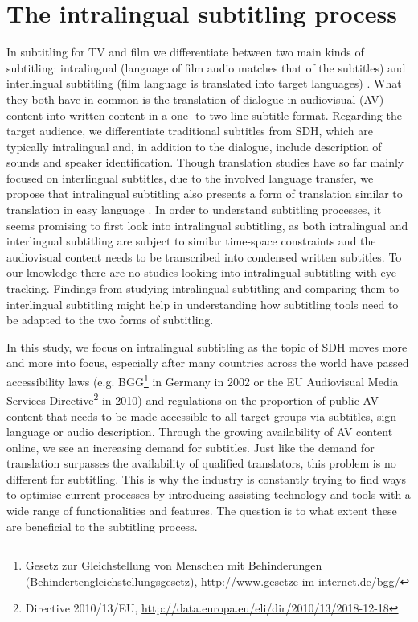 \documentclass[output=paper]{langscibook}
\begin{document}
\section{The intralingual subtitling process} \label{sec:tardel:2}
In subtitling for TV and film we differentiate between two main kinds of subtitling: intralingual (language of film audio matches that of the subtitles) and interlingual subtitling (film language is translated into target languages) \citep{cintas2003audiovisual}.
What they both have in common is the translation of dialogue in audiovisual (AV) content into written content in a one- to two-line subtitle format.
Regarding the target audience, we differentiate traditional subtitles from SDH, which are typically intralingual and, in addition to the dialogue, include description of sounds and speaker identification.
Though translation studies have so far mainly focused on interlingual subtitles, due to the involved language transfer, we propose that intralingual subtitling also presents a form of translation similar to translation in easy language \citep{HansenSchirraMaass}.
In order to understand subtitling processes, it seems promising to first look into intralingual subtitling, as both intralingual and interlingual subtitling are subject to similar time-space constraints and the audiovisual content needs to be transcribed into condensed written subtitles.
To our knowledge there are no studies looking into intralingual subtitling with eye tracking.
Findings from studying intralingual subtitling and comparing them to interlingual subtitling might help in understanding how subtitling tools need to be adapted to the two forms of subtitling.

In this study, we focus on intralingual subtitling as the topic of SDH moves more and more into focus, especially after many countries across the world have passed accessibility laws (e.g.
BGG\footnote{Gesetz zur Gleichstellung von Menschen mit Behinderungen (Behindertengleichstellungsgesetz), \url{http://www.gesetze-im-internet.de/bgg/}} in Germany in 2002 or the EU Audiovisual Media Services Directive\footnote{Directive 2010/13/EU, \url{http://data.europa.eu/eli/dir/2010/13/2018-12-18}} in 2010) and regulations on the proportion of public AV content that needs to be made accessible to all target groups via subtitles, sign language or audio description.
Through the growing availability of AV content online, we see an increasing demand for subtitles. Just like the demand for translation surpasses the availability of qualified translators, this problem is no different for subtitling.
This is why the industry is constantly trying to find ways to optimise current processes by introducing assisting technology and tools with a wide range of functionalities and features.
The question is to what extent these are beneficial to the subtitling process.
\end{document}
